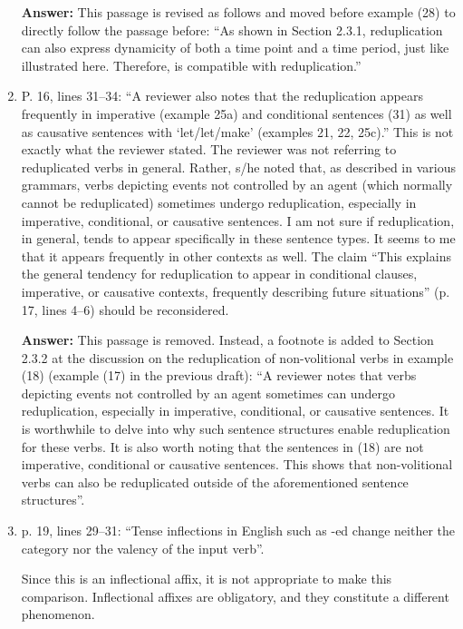 \documentclass[fleqn,twoside]{article}
\begin{document}
\begin{enumerate}
\noindent
\textbf{Answer:} This passage is revised as follows 
and moved before example (28) to directly follow the passage before: 
``As shown in Section 2.3.1, reduplication can also express
 dynamicity of both a time point and a time period, 
 just like  illustrated here. 
 Therefore,  is compatible with reduplication.''


\item P. 16, lines 31--34: ``A reviewer also notes that the reduplication appears frequently in imperative
(example 25a) and conditional sentences (31) as well as causative sentences with 
`let/let/make' (examples 21, 22, 25c).''
This is not exactly what the reviewer stated. The reviewer was not referring to reduplicated verbs in
general. Rather, s/he noted that, as described in various grammars, verbs depicting events not
controlled by an agent (which normally cannot be reduplicated) sometimes undergo reduplication,
especially in imperative, conditional, or causative sentences. I am not sure if reduplication, in general,
tends to appear specifically in these sentence types. It seems to me that it appears frequently in other
contexts as well. The claim ``This explains the general tendency for reduplication to appear in
conditional clauses, imperative, or causative contexts, frequently describing future situations'' (p. 17,
lines 4--6) should be reconsidered.

\noindent
\textbf{Answer:} This passage is removed. 
Instead, a footnote is added to Section 2.3.2 at the discussion on 
the reduplication of non-volitional verbs in example (18) (example (17) in the previous draft): 
``A reviewer notes that verbs depicting events not controlled 
by an agent sometimes can undergo reduplication, 
especially in imperative, conditional, or causative sentences. 
It is worthwhile to delve into why such sentence structures
 enable reduplication for these verbs. 
 It is also worth noting that the sentences in (18) 
 are not imperative, conditional or causative sentences. 
 This shows that non-volitional verbs can also be reduplicated
  outside of the aforementioned sentence structures''.

\item p. 19, lines 29--31: ``Tense inflections in English such as -ed change neither the category nor the
valency of the input verb''.

Since this is an inflectional affix, it is not appropriate to make this comparison. Inflectional affixes
are obligatory, and they constitute a different phenomenon.


\end{enumerate}
\end{document}
